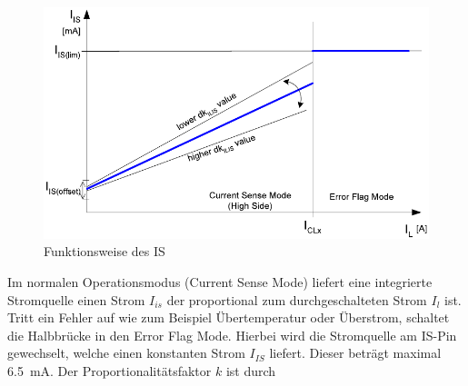 \begin{figure} [H]
	\centering
	\includegraphics[width=0.7\linewidth]{Bilder/IS_Pin.pdf}
	\caption{Funktionsweise des IS \cite[S.18]{btn}}
	\label{fig:IS_Pin}
\end{figure}\noindent
Im normalen Operationsmodus (Current Sense Mode) liefert eine integrierte Stromquelle einen Strom $I_{is}$ der proportional zum durchgeschalteten Strom $I_{l}$ ist. Tritt ein Fehler auf wie zum Beispiel Übertemperatur oder Überstrom, schaltet die Halbbrücke in den Error Flag Mode. Hierbei wird die Stromquelle am IS-Pin gewechselt, welche einen konstanten Strom $I_{IS}$ liefert.  Dieser beträgt maximal \SI{6,5}{mA}. Der Proportionalitätsfaktor $k$ ist durch

